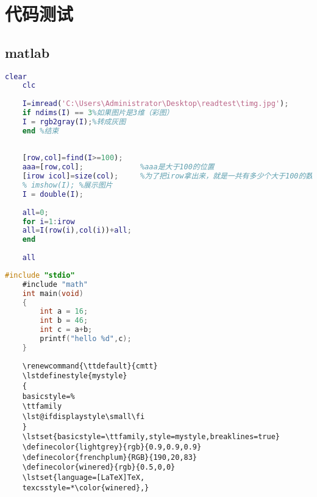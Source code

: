%
%








\chapter{代码测试}
\section{matlab}
\begin{lstlisting}[language=matlab] 
    clear
    clc
    
    I=imread('C:\Users\Administrator\Desktop\readtest\timg.jpg');
    if ndims(I) == 3%如果图片是3维（彩图）
    I = rgb2gray(I);%转成灰图
    end %结束
    
    
    [row,col]=find(I>=100);
    aaa=[row,col];             %aaa是大于100的位置 
    [irow icol]=size(col);     %为了把irow拿出来，就是一共有多少个大于100的数，有多少行就有多少个
    % imshow(I); %展示图片
    I = double(I);
    
    all=0;
    for i=1:irow
    all=I(row(i),col(i))+all;
    end    
    
    all
\end{lstlisting} 

\begin{lstlisting}[language=C]
    #include "stdio"
    #include "math"
    int main(void)
    {
        int a = 16;
        int b = 46;
        int c = a+b;
        printf("hello %d",c);
    }   
\end{lstlisting}



\begin{lstlisting}
    \renewcommand{\ttdefault}{cmtt}
    \lstdefinestyle{mystyle}
    {
    basicstyle=%
    \ttfamily
    \lst@ifdisplaystyle\small\fi
    }
    \lstset{basicstyle=\ttfamily,style=mystyle,breaklines=true}
    \definecolor{lightgrey}{rgb}{0.9,0.9,0.9}
    \definecolor{frenchplum}{RGB}{190,20,83}
    \definecolor{winered}{rgb}{0.5,0,0}
    \lstset{language=[LaTeX]TeX,
    texcsstyle=*\color{winered},}   
\end{lstlisting}


